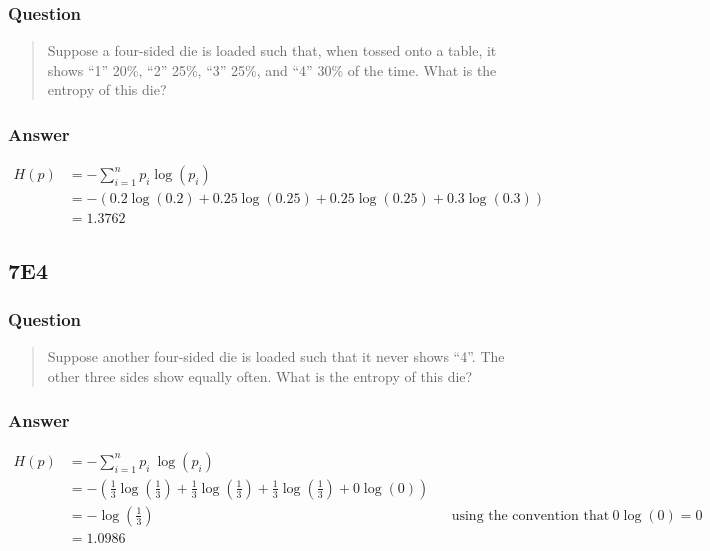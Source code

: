 \documentclass[
]{book}
\begin{document}
\hypertarget{question-62}{%
\subsubsection*{Question}\label{question-62}}

\begin{quote}
Suppose a four-sided die is loaded such that, when tossed onto a table, it shows ``1'' 20\%, ``2'' 25\%, ``3'' 25\%, and ``4'' 30\% of the time. What is the entropy of this die?
\end{quote}

\hypertarget{answer-62}{%
\subsubsection*{Answer}\label{answer-62}}

\[\begin{aligned}
H(p) &= -\sum^n_{i=1}p_i \log(p_i) \\
&= -(0.2 \log(0.2) + 0.25 \log(0.25) + 0.25 \log(0.25) + 0.3 \log(0.3))\\
&= 1.3762
\end{aligned}\]

\hypertarget{e4-5}{%
\subsection*{7E4}\label{e4-5}}

\hypertarget{question-63}{%
\subsubsection*{Question}\label{question-63}}

\begin{quote}
Suppose another four-sided die is loaded such that it never shows ``4''. The other three sides show equally often. What is the entropy of this die?
\end{quote}

\hypertarget{answer-63}{%
\subsubsection*{Answer}\label{answer-63}}

\[\begin{aligned}
H(p) &= -\sum^n_{i=1}p_i \ \log(p_i) \\
&= -(\frac{1}{3}  \log(\frac{1}{3}) + \frac{1}{3}  \log(\frac{1}{3}) + \frac{1}{3}  \log(\frac{1}{3}) + 0  \log(0))\\
&= -\log(\frac{1}{3}) &&\text{using the convention that } 0  \log(0) = 0 \\
&= 1.0986
\end{aligned}\]
\end{document}
